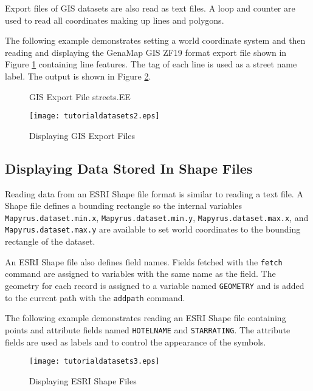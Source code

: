 Export files of GIS datasets are also read as text files.  A loop and counter
are used to read all coordinates making up lines and polygons.

The following example demonstrates setting a world coordinate system and then
reading and displaying the GenaMap GIS ZF19 format export file shown in Figure
\ref{streetsEE} containing line
features.  The tag of each line is used as a street name label.
The output is shown in Figure \ref{tutorialdatasets2}.

\begin{figure}[htb]

\caption{GIS Export File streets.EE}
\label{streetsEE}
\end{figure}



\begin{figure}[htb]
\texttt{[image: tutorialdatasets2.eps]}
\caption{Displaying GIS Export Files}
\label{tutorialdatasets2}
\end{figure}

\subsection{Displaying Data Stored In Shape Files}

Reading data from an ESRI Shape file format is similar to reading a text file.
A Shape file defines a bounding rectangle so the internal variables
\texttt{Mapyrus.dataset.min.x}, \texttt{Mapyrus.dataset.min.y},
\texttt{Mapyrus.dataset.max.x}, and \texttt{Mapyrus.dataset.max.y} are
available to set world coordinates to the bounding rectangle of the dataset.

An ESRI Shape file also defines field names.  Fields fetched with the
\texttt{fetch} command are assigned to variables with the same name as the
field.  The geometry for each record is assigned to a variable named
\texttt{GEOMETRY} and is added to the current path with the \texttt{addpath}
command.

The following example demonstrates reading an ESRI Shape file containing points
and attribute fields named \texttt{HOTELNAME} and \texttt{STARRATING}.  The
attribute fields are used as labels and to control the appearance of the
symbols.



\begin{figure}[htb]
\texttt{[image: tutorialdatasets3.eps]}
\caption{Displaying ESRI Shape Files}
\label{tutorialdatasets3}
\end{figure}

